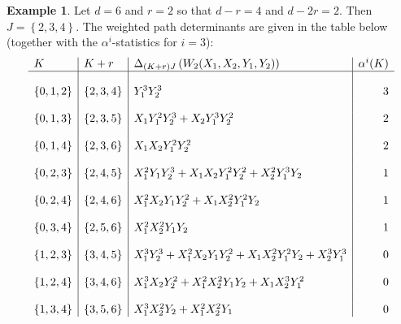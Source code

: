 \documentclass[unnumsec,webpdf,modern,medium]{oup-authoring-template}
\theoremstyle{theorem}
\theoremstyle{definition}
\newtheorem{example}[theorem]{Example}
\begin{document}



\begin{example}
	\label{ex:WPM}
	Let $d=6$ and $r=2$ so that $d-r=4$ and  $d-2r=2$.  Then $J=\left\{2,3,4\right\}$.  The weighted path determinants are given in the table below (together with the $\alpha^i$-statistics for $i=3$):
	$$\begin{array}{l|l|l|r}
		K & K+r & \Delta_{(K+r)J}\left(W_2(X_1,X_2,Y_1,Y_2)\right) & \alpha^i(K)\\
		\hline
		&&& \\
		\left\{0,1,2\right\} & \left\{2,3,4\right\} & Y_1^3Y_2^3 & 3\\
		&&\\
		\left\{0,1,3\right\} & \left\{2,3,5\right\} & X_1Y_1^2Y_2^3+X_2Y_1^3Y_2^2 & 2\\
		&&&\\
		\left\{0,1,4\right\} & \left\{2,3,6\right\} & X_1X_2Y_1^2Y_2^2 & 2\\
		&&&\\
		\left\{0, 2, 3\right\} & \left\{2,4,5\right\} & X_1^2Y_1Y_2^3+X_1X_2Y_1^2Y_2^2+X_2^2Y_1^3Y_2 & 1\\
		&&&\\
		\left\{0,2,4\right\} & \left\{2,4,6\right\} & X_1^2X_2Y_1Y_2^2+X_1X_2^2Y_1^2Y_2 & 1\\
		&&&\\
		\left\{0,3,4\right\} & \left\{2,5,6\right\} & X_1^2X_2^2Y_1Y_2 & 1\\
		&&&\\
		\left\{1, 2, 3\right\} & \left\{3,4,5\right\} & X_1^3Y_2^3+X_1^2X_2Y_1Y_2^2+X_1X_2^2Y_1^2Y_2+X_2^3Y_1^3 & 0\\
		&&&\\
		\left\{1, 2, 4\right\} & \left\{3,4,6\right\} & X_1^3X_2Y_2^2+{X_1^2X_2^2Y_1Y_2}+X_1X_2^3Y_1^2 & 0\\
		&&&\\
		\left\{1, 3, 4\right\} &  \left\{3,5,6\right\} & X_1^3X_2^2Y_2+X_1^2X_2^2Y_1 & 0\\

\end{array}$$
\end{example}
\end{document}
